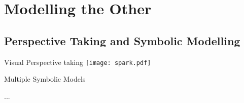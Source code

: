 \documentclass[compress]{beamer}
\begin{document}

\section{Modelling the Other}


\subsection{Perspective Taking and Symbolic Modelling}


\begin{frame}{Visual Perspective taking}
        \centering
        \texttt{[image: spark.pdf]}
        \vspace*{1em}

\end{frame}


{
\begin{frame}{Multiple Symbolic Models}
        \begin{multicols}{2}
            \begin{figure}
                \resizebox{0.35\textwidth}{!}{\usebox{\ontoinstance}}
            \end{figure}
            \begin{figure}
                \resizebox{0.35\textwidth}{!}{\usebox{\ontoinstance}}
            \end{figure}
            \begin{figure}
                \resizebox{0.35\textwidth}{!}{\usebox{\ontoinstance}}
            \end{figure}
            {\vspace*{1.5cm}\hspace*{2.5cm}\huge...}
        \end{multicols}
\end{frame}
}


\end{document}
